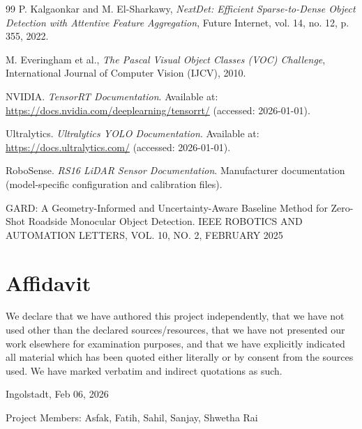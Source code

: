 \documentclass[12pt,a4paper]{report}
\begin{document}
{\begin{thebibliography}{99}
P. Kalgaonkar and M. El-Sharkawy,  
\textit{NextDet: Efficient Sparse-to-Dense Object Detection with Attentive Feature Aggregation},  
Future Internet, vol. 14, no. 12, p. 355, 2022.

M. Everingham et al.,
\textit{The Pascal Visual Object Classes (VOC) Challenge},
International Journal of Computer Vision (IJCV),
2010.

NVIDIA. \emph{TensorRT Documentation}. Available at: \url{https://docs.nvidia.com/deeplearning/tensorrt/} (accessed: 2026-01-01).

Ultralytics. \emph{Ultralytics YOLO Documentation}. Available at: \url{https://docs.ultralytics.com/} (accessed: 2026-01-01).

RoboSense. \emph{RS16 LiDAR Sensor Documentation}. Manufacturer documentation (model-specific configuration and calibration files).

GARD: A Geometry-Informed and
Uncertainty-Aware Baseline Method for Zero-Shot
Roadside Monocular Object Detection. IEEE ROBOTICS AND AUTOMATION LETTERS, VOL. 10, NO. 2, FEBRUARY 2025

\end{thebibliography}


\clearpage
\chapter*{Affidavit}

We declare that we have authored this project independently, that we have not used other than the declared sources/resources, that we have not presented our work elsewhere for examination purposes, and that we have explicitly indicated all material which has been quoted either literally or by consent from the sources used. We have marked verbatim and indirect quotations as such.

\vspace{1cm}

Ingolstadt, Feb 06, 2026

\vspace{0.5cm}

Project Members: Asfak, Fatih, Sahil, Sanjay, Shwetha Rai

\clearpage
\appendix

}
\end{document}
